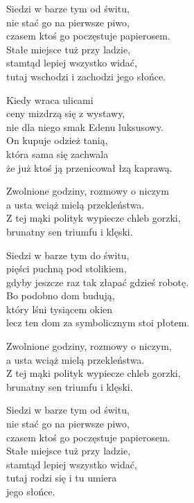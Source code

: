 \begin{text}
    Siedzi w barze tym od świtu,\\
    nie stać go na pierwsze piwo,\\
    czasem ktoś go poczęstuje papierosem.\\
    Stałe miejsce tuż przy ladzie,\\
    stamtąd lepiej wszystko widać,\\
    tutaj wschodzi i zachodzi jego słońce.

    Kiedy wraca ulicami\\
    ceny mizdrzą się z wystawy,\\
    nie dla niego smak Edenu luksusowy.\\
    On kupuje odzież tanią,\\
    która sama się zachwala\\
    że już ktoś ją przenicował łzą kaprawą.

    Zwolnione godziny, rozmowy o niczym\\
    a usta wciąż mielą przekleństwa.\\
    Z tej mąki polityk wypiecze chleb gorzki,\\
    brunatny sen triumfu i klęski.

    Siedzi w barze tym do świtu,\\
    pięści puchną pod stolikiem,\\
    gdyby jeszcze raz tak złapać gdzieś robotę.\\
    Bo podobno dom budują,\\
    który lśni tysiącem okien\\
    lecz ten dom za symbolicznym stoi płotem.

    Zwolnione godziny, rozmowy o niczym,\\
    a usta wciąż mielą przekleństwa.\\
    Z tej mąki polityk wypiecze chleb gorzki,\\
    brunatny sen triumfu i klęski.

    Siedzi w barze tym od świtu,\\
    nie stać go na pierwsze piwo,\\
    czasem ktoś go poczęstuje papierosem.\\
    Stałe miejsce tuż przy ladzie,\\
    stamtąd lepiej wszystko widać,\\
    tutaj rodzi się i tu umiera\\
    jego słońce.
\end{text}
\begin{chord}

\end{chord}